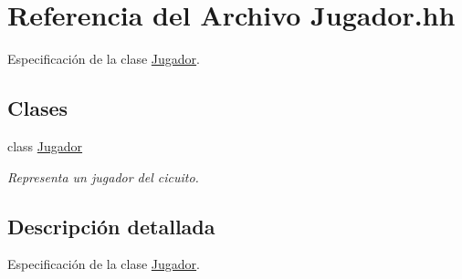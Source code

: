 \hypertarget{_jugador_8hh}{}\section{Referencia del Archivo Jugador.\+hh}
\label{_jugador_8hh}


Especificación de la clase \hyperlink{class_jugador}{Jugador}.  


\subsection*{Clases}
\begin{DoxyCompactItemize}
\item 
class \hyperlink{class_jugador}{Jugador}
\begin{DoxyCompactList}\small\item\em Representa un jugador del cicuito. \end{DoxyCompactList}\end{DoxyCompactItemize}


\subsection{Descripción detallada}
Especificación de la clase \hyperlink{class_jugador}{Jugador}. 

